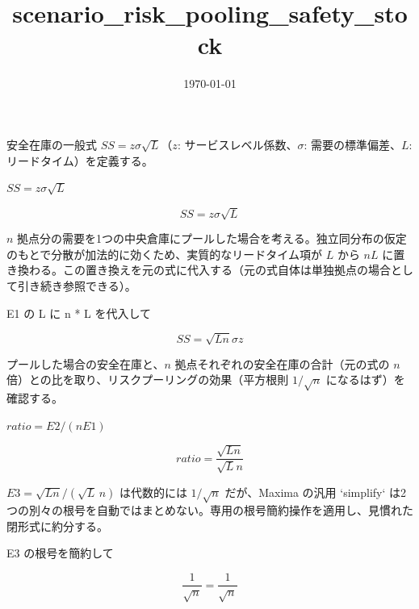 \documentclass[dvipdfmx,a4paper,11pt]{jsarticle}
\title{scenario\_risk\_pooling\_safety\_stock}
\date{\today}
\begin{document}
\maketitle

安全在庫の一般式 $SS=z\sigma\sqrt{L}$（$z$: サービスレベル係数、$\sigma$: 需要の標準偏差、$L$: リードタイム）を定義する。

$SS = z \sigma \sqrt{L}$

\begin{equation}
  SS = z \sigma \sqrt{L}
  \label{eq:E1}
\end{equation}

$n$ 拠点分の需要を1つの中央倉庫にプールした場合を考える。独立同分布の仮定のもとで分散が加法的に効くため、実質的なリードタイム項が $L$ から $nL$ に置き換わる。この置き換えを元の式に代入する（元の式自体は単独拠点の場合として引き続き参照できる）。

E1 の L に n * L を代入して

\begin{equation}
  SS = \sqrt{L n} \sigma z
  \label{eq:E2}
\end{equation}

プールした場合の安全在庫と、$n$ 拠点それぞれの安全在庫の合計（元の式の $n$ 倍）との比を取り、リスクプーリングの効果（平方根則 $1/\sqrt n$ になるはず）を確認する。

$ratio = E2 / (n E1)$

\begin{equation}
  ratio = \frac{\sqrt{L n}}{\sqrt{L} n}
  \label{eq:E3}
\end{equation}

$E3=\sqrt{Ln}/(\sqrt{L}\,n)$ は代数的には $1/\sqrt{n}$ だが、Maxima の汎用 `simplify` は2つの別々の根号を自動ではまとめない。専用の根号簡約操作を適用し、見慣れた閉形式に約分する。

E3 の根号を簡約して

\begin{equation}
  \frac{1}{\sqrt{n}}=\frac{1}{\sqrt{n}}
  \label{eq:E4}
\end{equation}
\end{document}
